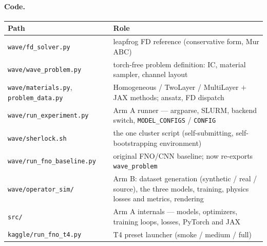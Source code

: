 \documentclass[11pt,a4paper]{article}
\begin{document}
\paragraph{Code.}
\begin{center}
\small
\begin{tabular}{@{}>{\raggedright\arraybackslash}p{5.4cm}>{\raggedright\arraybackslash}p{9.7cm}@{}}
\toprule
\textbf{Path} & \textbf{Role}\\
\midrule
\texttt{wave/fd\_solver.py}        & leapfrog FD reference (conservative form, Mur ABC)\\
\texttt{wave/wave\_problem.py}     & torch-free problem definition: IC, material sampler, channel layout\\
\texttt{wave/materials.py}, \texttt{problem\_data.py} & Homogeneous / TwoLayer / MultiLayer $+$ JAX methods; ansatz, FD dispatch\\
\texttt{wave/run\_experiment.py}   & Arm A runner --- argparse, SLURM, backend switch, \texttt{MODEL\_CONFIGS} / \texttt{CONFIG}\\
\texttt{wave/sherlock.sh}          & the one cluster script (self-submitting, self-bootstrapping environment)\\
\texttt{wave/run\_fno\_baseline.py} & original FNO/CNN baseline; now re-exports \texttt{wave\_problem}\\
\texttt{wave/operator\_sim/}       & Arm B: dataset generation (synthetic / real / source), the three models, training, physics losses and metrics, rendering\\
\texttt{src/}                      & Arm A internals --- models, optimizers, training loops, losses, PyTorch and JAX\\
\texttt{kaggle/run\_fno\_t4.py}    & T4 preset launcher (smoke / medium / full)\\
\bottomrule
\end{tabular}
\end{center}
\end{document}
